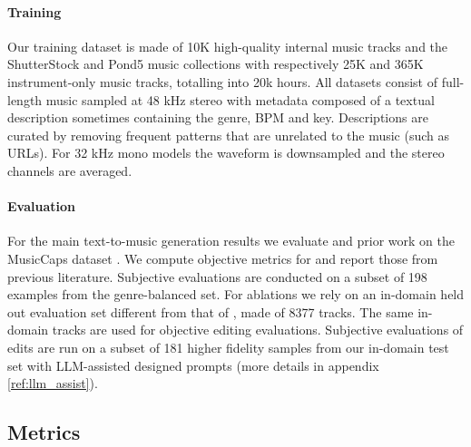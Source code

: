 \paragraph{Training}

Our training dataset is made of 10K high-quality internal music tracks and the ShutterStock and Pond5 music collections with respectively 25K and 365K instrument-only music tracks, totalling into 20k hours.
All datasets consist of full-length music sampled at 48 kHz stereo with metadata composed of a textual description sometimes containing the genre, BPM and key.
Descriptions are curated by removing frequent patterns that are unrelated to the music (such as URLs). 
For 32 kHz mono models the waveform is downsampled and the stereo channels are averaged.

\paragraph{Evaluation}

For the main text-to-music generation results we evaluate \proposed and prior work on the MusicCaps dataset \citep{agostinelli2023musiclm}.
We compute objective metrics for \proposed and report those from previous literature.
Subjective evaluations are conducted on a subset of 198 examples from the genre-balanced set.
For ablations we rely on an in-domain held out evaluation set different from that of \citet{copet2024simple}, made of 8377 tracks.
The same in-domain tracks are used for objective editing evaluations.
Subjective evaluations of edits are run on a subset of 181 higher fidelity samples from our in-domain test set with LLM-assisted designed prompts (more details in appendix \ref{ref:llm_assist}).

\subsection{Metrics}

